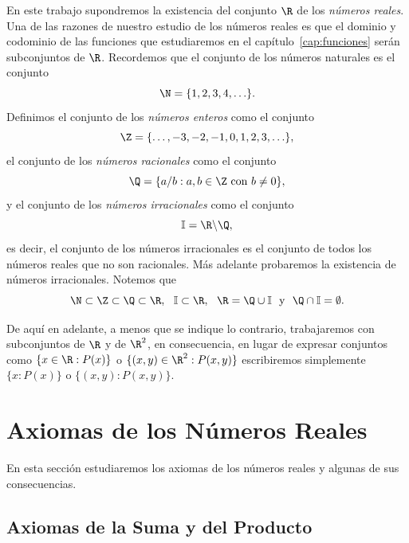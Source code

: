 \documentclass[12pt,a4paper]{book}
\newcommand{\I}{\mathbb{I}}
\begin{document}
    En este trabajo supondremos la existencia del conjunto $\R$ de los \textit{números
    reales}. Una de las razones de nuestro estudio de los números reales es que el
    dominio y codominio de las funciones que estudiaremos en el capítulo~\ref{cap:funciones} serán
    subconjuntos de $\R$. Recordemos que el conjunto de los números naturales es
    el conjunto
    \begin{equation*}
        \N=\{1,2,3,4,\ldots\}.
    \end{equation*}
    Definimos el conjunto de los \textit{números enteros} como el conjunto
    \begin{equation*}
        \Z=\{\ldots,-3,-2,-1,0,1,2,3,\ldots\},
    \end{equation*}
    el conjunto de los \textit{números racionales} como el conjunto
    \begin{equation*}
        \Q=\{a/b:a,b\in\Z\text{ con }b\neq 0\},
    \end{equation*}
    y el conjunto de los \textit{números irracionales} como el conjunto
    \begin{equation*}
        \I=\R\backslash\Q,
    \end{equation*}
    es decir, el conjunto de los números irracionales es el conjunto de todos los
    números reales que no son racionales. Más adelante probaremos la existencia
    de números irracionales. Notemos que
    \begin{equation*}
        \N\subset\Z\subset\Q\subset\R,\ \ \I\subset\R,\ \ \R=\Q\cup\I\ \text{ y }\ \Q\cap\I=\emptyset.
    \end{equation*}

    De aquí en adelante, a menos que se indique lo contrario, trabajaremos
    con subconjuntos de $\R$ y de $\R^{2}$, en consecuencia, en lugar de expresar conjuntos
    como $\{x\in\R:P(x)\}$ o $\{(x,y)\in\R^{2}:P(x,y)\}$ escribiremos simplemente
    $\{x:P(x)\}$ o $\{(x,y):P(x,y)\}$.

    \section{Axiomas de los Números Reales}

    En esta sección estudiaremos los axiomas de los números reales y algunas
    de sus consecuencias.

    \subsection{Axiomas de la Suma y del Producto}\label{subsec:axiomas-suma}
\end{document}

